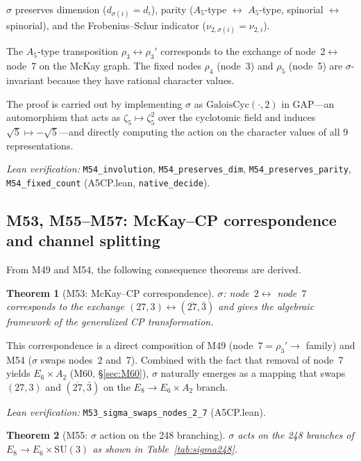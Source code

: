 \documentclass[sn-mathphys-num,Numbered]{sn-jnl}
\theoremstyle{thmstyleone}
\newtheorem{theorem}{Theorem}[section]
\theoremstyle{thmstylethree}
\newcommand{\SU}{\mathrm{SU}}
\begin{document}
$\sigma$ preserves dimension ($d_{\sigma(i)} = d_i$), parity ($A_5$-type
$\leftrightarrow$ $A_5$-type, spinorial $\leftrightarrow$ spinorial), and the
Frobenius--Schur indicator ($\nu_{2,\sigma(i)} = \nu_{2,i}$).

The $A_5$-type transposition $\rho_3 \leftrightarrow \rho_3'$ corresponds to
the exchange of node~$2 \leftrightarrow$ node~$7$ on the McKay graph.  The
fixed nodes $\rho_4$ (node~3) and $\rho_5$ (node~5) are $\sigma$-invariant
because they have rational character values.

The proof is carried out by implementing $\sigma$ as
$\mathrm{GaloisCyc}(\cdot, 2)$ in GAP---an automorphism that acts as
$\zeta_5 \mapsto \zeta_5^2$ over the cyclotomic field and induces
$\sqrt{5} \mapsto -\sqrt{5}$---and directly computing the action on the
character values of all 9 representations.

\noindent\textit{Lean verification:}
\texttt{M54\_involution}, \texttt{M54\_preserves\_dim},
\texttt{M54\_preserves\_parity}, \texttt{M54\_fixed\_count}
(A5CP.lean, \texttt{native\_decide}).


\subsection{M53, M55--M57: McKay--CP correspondence and channel
  splitting}\label{sec:M53-M57}

From M49 and M54, the following consequence theorems are derived.

\begin{theorem}[M53: McKay--CP correspondence]\label{thm:M53}
$\sigma$: node~$2 \leftrightarrow$ node~$7$ corresponds to the exchange
$(27,3) \leftrightarrow (\overline{27}, \bar{3})$ and gives the algebraic
framework of the generalized CP transformation.
\end{theorem}

This correspondence is a direct composition of M49 (node~$7 = \rho_3'
\to$ family) and M54 ($\sigma$ swaps nodes~2 and~7).  Combined with the fact
that removal of node~7 yields $E_6 \times A_2$ (M60, \S\ref{sec:M60}),
$\sigma$ naturally emerges as a mapping that swaps $(27,3)$ and
$(\overline{27}, \bar{3})$ on the $E_8 \to E_6 \times A_2$ branch.

\noindent\textit{Lean verification:}
\texttt{M53\_sigma\_swaps\_nodes\_2\_7} (A5CP.lean).

\begin{theorem}[M55: $\sigma$ action on the 248 branching]\label{thm:M55}
$\sigma$ acts on the 248 branches of $E_8 \to E_6 \times \SU(3)$ as shown in
Table~\ref{tab:sigma248}.
\end{theorem}
\end{document}
